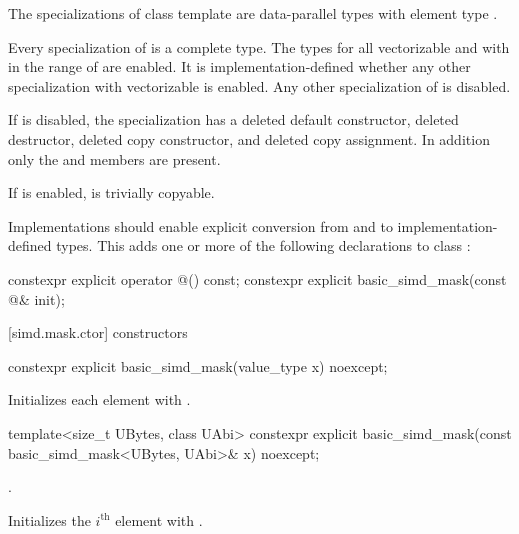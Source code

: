 \pnum
The specializations of class template  are data-parallel types with element
type .

\pnum
Every specialization of  is a complete type.
The types  for all vectorizable
 and with  in the range of  are enabled.
It is implementation-defined whether any other 
specialization with vectorizable  is enabled.
Any other specialization of  is disabled.

If  is disabled, the specialization has a deleted
default constructor, deleted destructor, deleted copy constructor, and deleted copy assignment.
In addition only the  and  members are present.

If  is enabled,  is
trivially copyable.

\pnum
Implementations should enable explicit conversion from and to implementation-defined types. This
adds one or more of the following declarations to class :

\begin{codeblock}
constexpr explicit operator @\impdef@() const;
constexpr explicit basic_simd_mask(const @\impdef@& init);
\end{codeblock}

[simd.mask.ctor]{ constructors}

\begin{itemdecl}
constexpr explicit basic_simd_mask(value_type x) noexcept;
\end{itemdecl}

\begin{itemdescr}
  \pnum\effects
  Initializes each element with .
\end{itemdescr}

\begin{itemdecl}
template<size_t UBytes, class UAbi>
  constexpr explicit basic_simd_mask(const basic_simd_mask<UBytes, UAbi>& x) noexcept;
\end{itemdecl}

\begin{itemdescr}
  \pnum\constraints
  .

  \pnum\effects
  Initializes the $i^\text{th}$ element with  \foralli.
\end{itemdescr}

